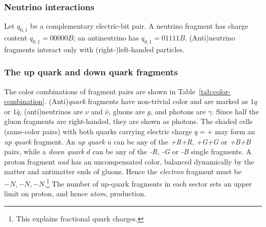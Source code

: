 \documentclass[a4paper]{article}
\begin{document}
\subsubsection{Neutrino interactions}
Let $q_{0,1}$ be a complementary electric-bit pair. A neutrino fragment has charge content $q_{0,1}=00000B$; an antineutrino has $q_{0,1}=01111B$. (Anti)neutrino fragments interact only with (right-)left-handed particles.
\subsubsection{The up quark and down quark fragments}
The color combinations of fragment pairs are shown in Table~\ref{tab:color-combination}.
(Anti)\emph{quark} fragments have non-trivial color and are marked as $1q$ or $1\bar{q}$, (anti)neutrinos are $\nu$ and $\bar{\nu}$, gluons are $g$, and photons are $\gamma$.
Since half the gluon fragments are right-handed, they are shown as photons.
The shaded cells (same-color pairs) with both quarks carrying electric charge $q=+$ may form an \emph{up quark} fragment.
An \emph{up quark} $u$ can be any of the \emph{+R+R}, \emph{+G+G} or \emph{+B+B} pairs, while a \emph{down quark} $d$ can be any of the \emph{-R}, \emph{-G} or \emph{-B} single fragments. A proton fragment \emph{uud} has an uncompensated color, balanced dynamically by the matter and antimatter ends of gluons. Hence the \emph{electron} fragment must be $-N,-N,-N$.\footnote{This explains fractional quark charges.}
The number of up-quark fragments in each sector sets an upper limit on proton, and hence \textit{atom}, production.
\end{document}
